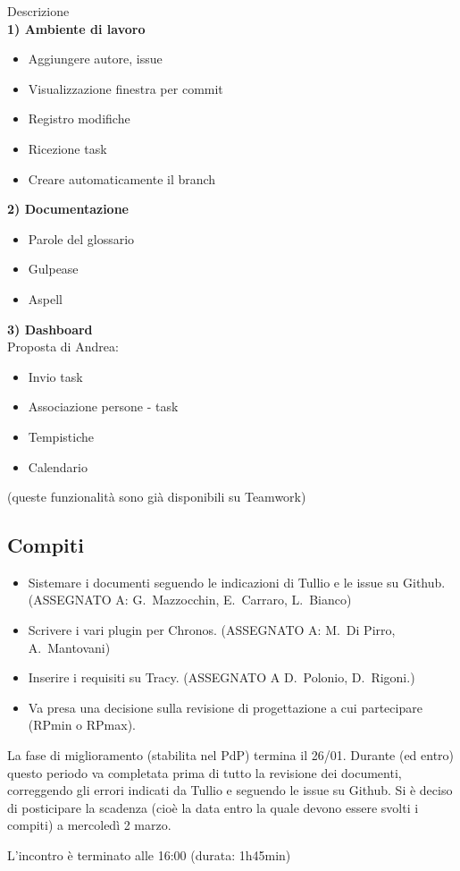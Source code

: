 \documentclass[11pt]{meetingmins}
\begin{document}
Descrizione\\

\textbf{1) Ambiente di lavoro}

\begin{itemize}
\item Aggiungere autore, issue
\item Visualizzazione finestra per commit
\item Registro modifiche
\item Ricezione task
\item Creare automaticamente il branch
\end{itemize}

\textbf{2) Documentazione}

\begin{itemize}
\item Parole del glossario
\item Gulpease
\item Aspell
\end{itemize}

\textbf{3) Dashboard}\\

Proposta di Andrea:

\begin{itemize}
\item Invio task
\item Associazione persone - task
\item Tempistiche
\item Calendario
\end{itemize}

(queste funzionalità sono già disponibili su Teamwork)

\subsection{Compiti}

\begin{itemize}
\item Sistemare i documenti seguendo le indicazioni di Tullio e le issue su Github. (ASSEGNATO A: G.~Mazzocchin, E.~Carraro, L.~Bianco)
\item Scrivere i vari plugin per Chronos. (ASSEGNATO A: M.~Di Pirro, A.~Mantovani)
\item Inserire i requisiti su Tracy. (ASSEGNATO A D.~Polonio, D.~Rigoni.)
\item Va presa una decisione sulla revisione di progettazione a cui partecipare (RPmin o RPmax).
\end{itemize}

La fase di miglioramento (stabilita nel PdP) termina il 26/01. Durante (ed entro) questo periodo va completata prima di tutto la revisione dei documenti, correggendo gli errori indicati da Tullio e seguendo le issue su Github.
Si è deciso di posticipare la scadenza (cioè la data entro la quale devono essere svolti i compiti) a mercoledì 2 marzo.

L'incontro è terminato alle 16:00 (durata: 1h45min)\\

\end{document}
